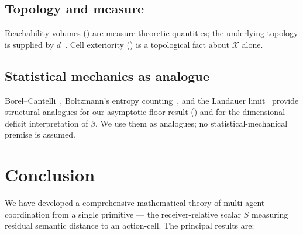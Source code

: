 \documentclass[11pt,twocolumn,a4paper]{article}
\newcommand{\X}{\mathcal{X}}
\begin{document}
\subsection{Topology and measure}

Reachability volumes () are measure-theoretic
quantities; the underlying topology is supplied by
$d$~\cite{kelley1955,munkres2000}. Cell exteriority
() is a topological fact about $\X$ alone.

\subsection{Statistical mechanics as analogue}

Borel--Cantelli~\cite{borel1909,cantelli1917}, Boltzmann's entropy
counting~\cite{boltzmann1877}, and the Landauer
limit~\cite{landauer1961,bennett1973} provide structural
analogues for our asymptotic floor result ()
and for the dimensional-deficit interpretation of $\beta$. We use
them as analogues; no statistical-mechanical premise is assumed.

\section{Conclusion}
\label{sec:conclusion}

We have developed a comprehensive mathematical theory of multi-agent
coordination from a single primitive --- the receiver-relative scalar
$S$ measuring residual semantic distance to an action-cell. The
principal results are:
\end{document}

